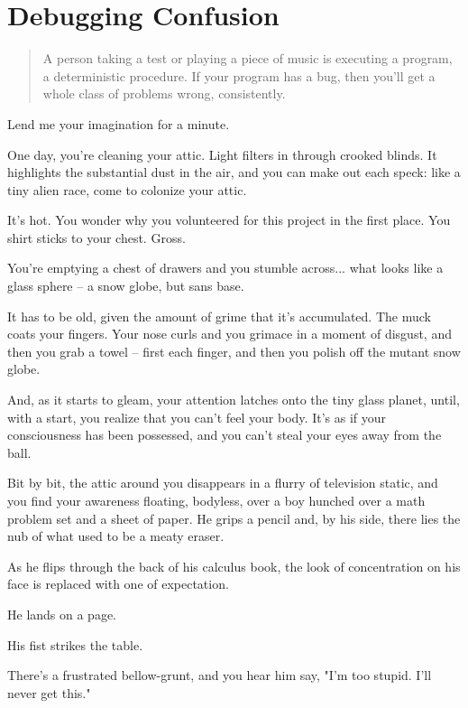 \section{Debugging Confusion}
\begin{quote}
A person taking a test or playing a piece of music is executing a program, a
deterministic procedure.  If your program has a bug, then you'll get a whole
class of problems wrong, consistently.
\end{quote}

Lend me your imagination for a minute.

One day, you're cleaning your attic. Light filters in through crooked blinds. It
highlights the substantial dust in the air, and you can make out
each speck: like a tiny alien race, come to colonize your attic. 

It's hot. You wonder why you volunteered for this project in the first
place. You shirt sticks to your chest. Gross.

You're emptying a chest of drawers and you stumble across...  what
looks like a glass sphere -- a snow globe, but sans base.

It has to be old, given the amount of grime that it's accumulated. The muck
coats your fingers. Your nose curls and you grimace in a moment of disgust, and then you grab a
towel -- first each finger, and then you polish off the mutant snow
globe.

And, as it starts to gleam, your attention latches onto the tiny glass planet,
until, with a start, you realize that you can't feel your body. It's as if your
consciousness has been possessed, and you can't steal your eyes away from the
ball.

Bit by bit, the attic around you disappears in a flurry of television static, and you find your awareness floating,
bodyless, over a boy hunched over a math problem set and a sheet of paper. He
grips a pencil and, by his side, there lies the nub of what used to be a meaty
eraser.

As he flips through the back of his calculus book, the look of concentration on
his face is replaced with one of expectation.

He lands on a page. 

His fist strikes the table.

There's a frustrated bellow-grunt, and you hear him say, "I'm too stupid. I'll
never get this."

